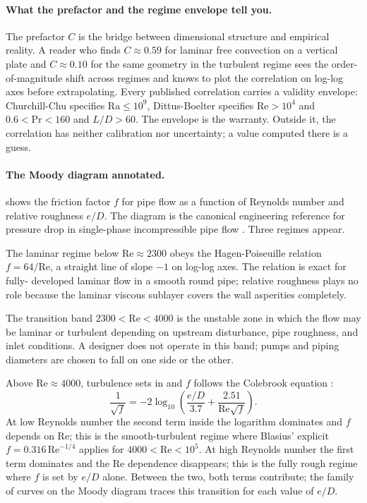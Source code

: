 \paragraph{What the prefactor and the regime envelope tell you.}
The prefactor $C$ is the bridge between dimensional structure and
empirical reality. A reader who finds $C \approx 0.59$ for laminar
free convection on a vertical plate and $C \approx 0.10$ for the
same geometry in the turbulent regime sees the order-of-magnitude
shift across regimes and knows to plot the correlation on log-log
axes before extrapolating. Every published correlation carries a
validity envelope: Churchill-Chu specifies $\mathrm{Ra} \leq 10^{9}$,
Dittus-Boelter specifies $\mathrm{Re} > 10^{4}$ and $0.6 <
\mathrm{Pr} < 160$ and $L/D > 60$. The envelope is the warranty.
Outside it, the correlation has neither calibration nor uncertainty;
a value computed there is a guess.

\paragraph{The Moody diagram annotated.}
 shows the friction factor $f$ for pipe
flow as a function of Reynolds number and relative roughness
$e/D$. The diagram is the canonical engineering reference for
pressure drop in single-phase incompressible pipe flow
\cite{paper:moody-1944}. Three regimes appear.

The laminar regime below $\mathrm{Re} \approx 2300$ obeys the
Hagen-Poiseuille relation $f = 64/\mathrm{Re}$, a straight line of
slope $-1$ on log-log axes. The relation is exact for fully-
developed laminar flow in a smooth round pipe; relative roughness
plays no role because the laminar viscous sublayer covers the wall
asperities completely.

The transition band $2300 < \mathrm{Re} < 4000$ is the unstable
zone in which the flow may be laminar or turbulent depending on
upstream disturbance, pipe roughness, and inlet conditions. A
designer does not operate in this band; pumps and piping
diameters are chosen to fall on one side or the other.

Above $\mathrm{Re} \approx 4000$, turbulence sets in and $f$
follows the Colebrook equation
\cite{paper:colebrook-1939}:
\[
\frac{1}{\sqrt{f}} = -2 \log_{10}\!\left(\frac{e/D}{3.7}
  + \frac{2.51}{\mathrm{Re} \sqrt{f}}\right).
\]
At low Reynolds number the second term inside the logarithm
dominates and $f$ depends on $\mathrm{Re}$; this is the
smooth-turbulent regime where Blasius' explicit
$f = 0.316 \,\mathrm{Re}^{-1/4}$ applies for $4000 < \mathrm{Re} <
10^{5}$. At high Reynolds number the first term dominates and the
$\mathrm{Re}$ dependence disappears; this is the fully rough
regime where $f$ is set by $e/D$ alone. Between the two, both terms
contribute; the family of curves on the Moody diagram traces this
transition for each value of $e/D$.

